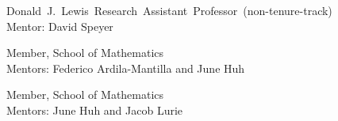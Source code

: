 
  {\mbox{Donald J. Lewis Research Assistant Professor (non-tenure-track)}\\
   Mentor: David Speyer}

  {Member, School of Mathematics\\
   Mentors: Federico Ardila-Mantilla and June Huh}

  {Member, School of Mathematics\\
   Mentors: June Huh and Jacob Lurie}
